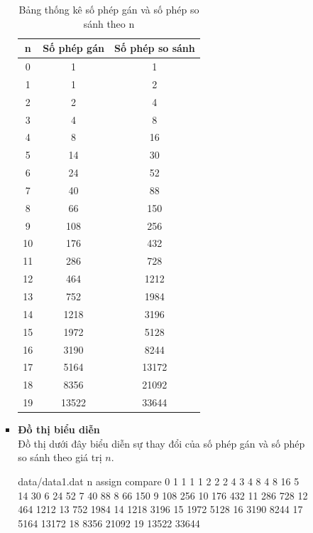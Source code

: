 \documentclass[12pt,a4paper]{article}
\begin{document}
\begin{enumerate}[label=\textbf{Câu 2:} ]
\begin{enumerate}[label=\textbf{Câu 3:} ]
\begin{enumerate}[label=\alph*)]
\begin{itemize}
\begin{table}[h!]
    \centering
    \begin{tabular}{|c|c|c|}
        \hline
        \textbf{n} & \textbf{Số phép gán} & \textbf{Số phép so sánh} \\
        \hline
        0 & 1 & 1 \\
        1 & 1 & 2 \\
        2 & 2 & 4 \\
        3 & 4 & 8 \\
        4 & 8 & 16 \\
        5 & 14 & 30 \\
        6 & 24 & 52 \\
        7 & 40 & 88 \\
        8 & 66 & 150 \\
        9 & 108 & 256 \\
        10 & 176 & 432 \\
        11 & 286 & 728 \\
        12 & 464 & 1212 \\
        13 & 752 & 1984 \\
        14 & 1218 & 3196 \\
        15 & 1972 & 5128 \\
        16 & 3190 & 8244 \\
        17 & 5164 & 13172 \\
        18 & 8356 & 21092 \\
        19 & 13522 & 33644 \\
        \hline
    \end{tabular}
    \caption{Bảng thống kê số phép gán và số phép so sánh theo n}
\end{table}
\item \textbf{Đồ thị biểu diễn}\\
Đồ thị dưới đây biểu diễn sự thay đổi của số phép gán và số phép so sánh theo giá trị \(n\).
\newpage 
\begin{filecontents*}{data/data1.dat}
n assign compare
0 1 1
1 1 2
2 2 4
3 4 8
4 8 16
5 14 30
6 24 52
7 40 88
8 66 150
9 108 256
10 176 432
11 286 728
12 464 1212
13 752 1984
14 1218 3196
15 1972 5128
16 3190 8244
17 5164 13172
18 8356 21092
19 13522 33644
\end{filecontents*}


\end{itemize}
\end{enumerate}
\end{enumerate}
\end{enumerate}
\end{document}
